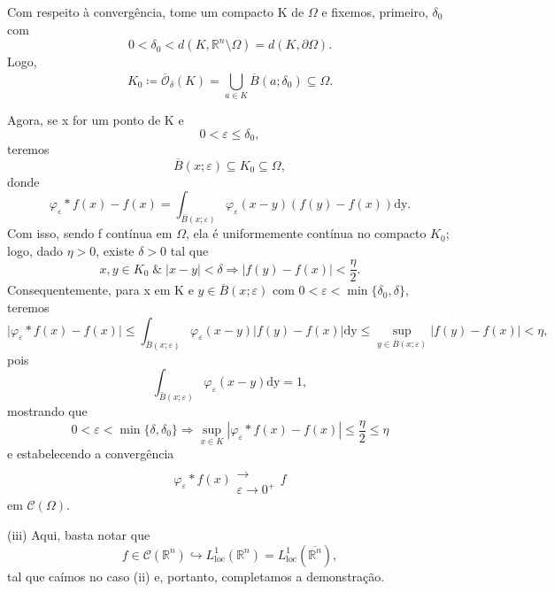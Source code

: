 \documentclass[../distribution_theory_notes.tex]{subfiles}
\begin{document}
\begin{proof*}
           Com respeito à convergência, tome um compacto K de \(\Omega \) e fixemos, primeiro, \(\delta_{0}\) com 
             \[
               0<\delta_{0}< d(K, \mathbb{R}^{n}\setminus{\Omega }) = d(K, \partial \Omega ).
             \]
             Logo, 
               \[
                 K_{0}\coloneqq \overline{\mathcal{O}}_{\delta }(K)=\bigcup_{a\in K}^{}\overline{B}(a; \delta_{0})\subseteq \Omega .
               \]

               Agora, se x for um ponto de K e 
                 \[
                   0<\varepsilon \leq \delta_{0},
                 \]
                 teremos 
                   \[
                     \overline{B}(x; \varepsilon )\subseteq K_{0}\subseteq \Omega ,
                   \]
                   donde 
                     \[
                       \varphi_{\varepsilon }*f(x)-f(x)=\int_{\overline{B}(x; \varepsilon )}^{}\varphi_{\varepsilon }(x-y)(f(y)-f(x)) \mathrm{dy}.
                     \]
                     Com isso, sendo f contínua em \(\Omega \), ela é uniformemente contínua no compacto \(K_{0}\); logo, dado \(\eta>0\), existe \(\delta>0\) tal que 
                       \[
                         x, y\in K_{0}\;\&\; | x-y |<\delta  \Rightarrow | f(y)-f(x) |<\frac{\eta }{2}.
                       \]
                       Consequentemente, para x em K e \(y\in \overline{B}(x; \varepsilon )\) com \(0<\varepsilon <\min\limits_{}\{\delta_{0}, \delta \}\), teremos 
                         \[
                           \biggl\vert \varphi_{\varepsilon }*f(x)-f(x) \biggr\vert \leq \int_{\overline{B}(x; \varepsilon )}^{}\varphi_{\varepsilon }(x-y)| f(y)-f(x) | \mathrm{dy}\leq \sup_{y\in \overline{B}(x; \varepsilon )}| f(y)-f(x) |<\eta ,
                         \]
                         pois 
                           \[
                             \int_{\overline{B}(x; \varepsilon )}^{}\varphi_{\varepsilon }(x-y) \mathrm{dy}=1,
                           \]
                           mostrando que 
                             \[
                               0<\varepsilon <\min\limits_{}\{\delta, \delta_{0}\} \Rightarrow \sup_{x\in K} | \varphi_{\varepsilon }*f(x)-f(x) |\leq \frac{\eta }{2}\leq \eta 
                             \] 
                             e estabelecendo a convergência 
                               \[
                                 \varphi_{\varepsilon }*f(x)\substack{ \\ \longrightarrow \\ \varepsilon \to0^{+}}f
                               \]
                               em \(\mathcal{C}(\Omega ).\)

                               (iii) Aqui, basta notar que 
                                 \[
                                   f\in \mathcal{C}(\mathbb{R}^{n})\hookrightarrow L_{\mathrm{loc}}^{1}(\mathbb{R}^{n})=L_{\mathrm{loc}}^{1}(\overline{\mathbb{R}^{n}}),
                                 \]
                                 tal que caímos no caso (ii) e, portanto, completamos a demonstração. \qedsymbol 
\end{proof*}
\end{document}
